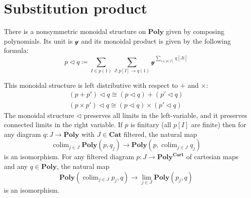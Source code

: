\documentclass[11pt, one side, article]{memoir}
\theoremstyle{definition}
\theoremstyle{plain}
\DeclareMathOperator*{\colim}{colim}
\newcommand{\Cat}[1]{\mathbf{#1}}%
\newcommand{\smcat}{\Cat{Cat}}
\newcommand{\yon}{\mathcal{y}}
\newcommand{\poly}{\Cat{Poly}}
\newcommand{\polycart}{\poly^{\Cat{Cart}}}
\newcommand{\0}{\textsf{0}}
\newcommand{\1}{\tn{\textsf{1}}}
\newcommand{\tri}{\mathbin{\triangleleft}}
\begin{document}
\chapter{Substitution product}

There is a nonsymmetric monoidal structure on $\poly$ given by composing polynomials. Its unit is $\yon$ and its monoidal product is given by the following formula:
\begin{equation}
p\tri q\coloneqq\sum_{I\in p(1)}\sum_{J\colon p[I]\to q(1)}\yon^{\sum\limits_{i\in p[I]}q[Ji]}
\end{equation}

This monoidal structure is left distributive with respect to $+$ and $\times$:
\begin{align}
	(p+p')\tri q\cong (p\tri q)+(p'\tri q)\label{eqn.comp_plus}\\
	(p\times p')\tri q\cong (p\tri q)\times(p'\tri q)\label{eqn.comp_times}
\end{align}
The monoidal structure $\tri$ preserves all limits in the left-variable, and it preserves connected limits in the right variable. If $p$ is finitary (all $p[I]$ are finite) then for any diagram $q\colon J\to\poly$ with $J\in\smcat$ filtered, the natural map
\begin{equation}
\colim_{j\in J}\poly(p,q_j)\to\poly(p,\colim_{j\in J}q_j)
\end{equation}
is an isomorphism. For any filtered diagram $p\colon J\to\polycart$ of cartesian maps and any $q\in\poly$, the natural map
\begin{equation}
\poly(\colim_{j\in J}p_j,q)\to\lim_{j\in J}\poly(p_j,q)
\end{equation}
is an isomorphism.
\end{document}
